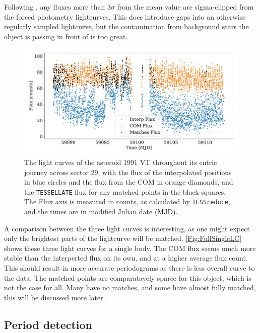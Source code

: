 \documentclass{UCreport}
\begin{document}
Following \citet{McNeill2023}, any fluxes more than $3\sigma$ from the mean value are sigma-clipped from the forced photometry lightcurves.
This does introduce gaps into an otherwise regularly sampled lightcurve, but the contamination from background stars the object is passing in front of is too great.

\begin{figure}
  \centering
  \includegraphics[width =\textwidth]{../OzData/SingleBodyLC1991 VT.pdf}
  \caption[Light curves of 1991 VT]{The light curves of the asteroid 1991 VT throughout its entrie journey across sector 29, with the flux of the interpolated positions in blue circles and the flux from the COM in orange diamonds, and the \texttt{TESSELLATE} flux for any matched points in the black squares.
    The Flux axis is measured in counts, as calculated by \texttt{TESSreduce}, and the times are in modified Julian date (MJD).}
  \label{Fig:FullSingleLC}
\end{figure}
A comparison between the three light curves is interesting, as one might expect only the brightest parts of the lightcurve will be matched.
\autoref{Fig:FullSingleLC} shows these three light curves for a single body.
The COM flux seems much more stable than the interperted flux on its own, and at a higher average flux count.
This should result in more accurate periodograms as there is less overall curve to the data.
The matched points are comparatavely sparce for this object, which is not the case for all.
Many have no matches, and some have almost fully matched, this will be discussed more later.







\subsection{Period detection}\label{SubSec:Periods}
\end{document}
